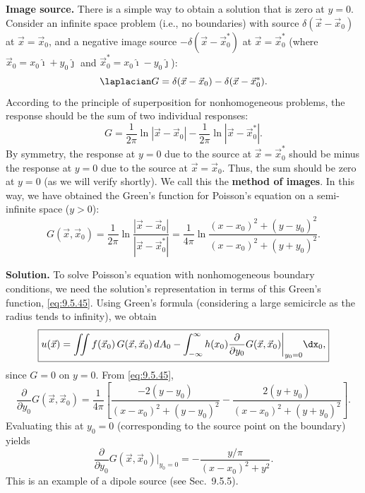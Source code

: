 \textbf{Image source.}
There is a simple way to obtain a solution that is zero at $y=0$.  Consider an infinite space problem (i.e., no boundaries) with source $\delta(\vec{x}-\vec{x}_0)$ at $\vec{x} = \vec{x}_0$, and a negative image source $-\delta(\vec{x}-\vec{x}_0^*)$ at $\vec{x} = \vec{x}_0^*$ (where $\vec{x}_0 = x_0\hat{\imath}+y_0\hat{\jmath}$ and $\vec{x}_0^* = x_0\hat{\imath}-y_0\hat{\jmath}$):
\begin{equation}
\label{eq:9.5.43}
\laplacian G = \delta(\vec{x}-\vec{x}_0) - \delta(\vec{x}-\vec{x}_0^*).
\end{equation}
According to the principle of superposition for nonhomogeneous problems, the response should be the sum of two individual responses:
\begin{equation}
\label{eq:9.5.44}
G = \frac{1}{2\pi}\ln|\vec{x}-\vec{x}_0| - \frac{1}{2\pi}\ln|\vec{x}-\vec{x}_0^*|.
\end{equation}
By symmetry, the response at $y = 0$ due to the source at $\vec{x} = \vec{x}_0^*$ should be minus the response at $y = 0$ due to the source at $\vec{x} = \vec{x}_0$.  Thus, the sum should be zero at $y = 0$ (as we will verify shortly).  We call this the \textbf{method of images}.  In this way, we have obtained the Green's function for Poisson's equation on a semi-infinite space ($y > 0$):
\begin{equation}
\label{eq:9.5.45}
\boxed{G(\vec{x},\vec{x}_0) = \frac{1}{2\pi}\ln\frac{|\vec{x}-\vec{x}_0|}{|\vec{x}-\vec{x}_0^*|} = \frac{1}{4\pi}\ln\frac{(x-x_0)^2+(y-y_0)^2}{(x-x_0)^2+(y+y_0)^2}.}
\end{equation}

\textbf{Solution.}
To solve Poisson's equation with nonhomogeneous boundary conditions, we need the solution's representation in terms of this Green's function, \eqref{eq:9.5.45}.  Using Green's formula (considering a large semicircle as the radius tends to infinity), we obtain
\begin{equation}
\label{eq:9.5.46}
\boxed{u(\vec{x}) = \iint f(\vec{x}_0)\,G(\vec{x},\vec{x}_0)\,dA_0 - \int_{-\infty}^{\infty} h(x_0)\frac{\partial}{\partial y_0}G(\vec{x},\vec{x}_0)\bigg|_{y_0=0}\dx_0,}
\end{equation}
since $G = 0$ on $y = 0$.  From \eqref{eq:9.5.45},
\[
\frac{\partial}{\partial y_0}G(\vec{x},\vec{x}_0) = \frac{1}{4\pi}\left[\frac{-2(y-y_0)}{(x-x_0)^2+(y-y_0)^2} - \frac{2(y+y_0)}{(x-x_0)^2+(y+y_0)^2}\right].
\]
Evaluating this at $y_0 = 0$ (corresponding to the source point on the boundary) yields
\begin{equation}
\label{eq:9.5.47}
\boxed{\frac{\partial}{\partial y_0}G(\vec{x},\vec{x}_0)\bigg|_{y_0=0} = -\frac{y/\pi}{(x-x_0)^2+y^2}.}
\end{equation}
This is an example of a dipole source (see Sec.~9.5.5).

